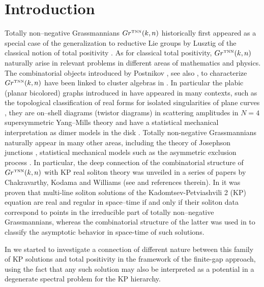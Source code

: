\documentclass[11pt]{amsart}
\theoremstyle{plain}
\numberwithin{equation}{section}
\def \GTNN {{Gr^{\mbox{\tiny TNN}} (k,n)}}
\begin{document}
\tableofcontents
\section{Introduction}

Totally non--negative Grassmannians $\GTNN$ historically first appeared as a special case of the generalization to reductive Lie groups by Lusztig  \cite{Lus1,Lus2} of the classical notion of total positivity \cite{GK,GK2,Sch,Kar}. As for  classical total positivity, $\GTNN$ naturally arise in relevant problems in different areas of mathematics and physics. The combinatorial objects introduced by Postnikov \cite{Pos}, see also \cite{Rie}, to characterize $\GTNN$ have been linked to cluster algebras in \cite{Sc,OPS}. In particular the plabic (planar bicolored) graphs introduced in \cite{Pos} have appeared in many contexts, such as the topological classification of real forms for isolated singularities of plane curves \cite{FPS}, they are on--shell diagrams (twistor diagrams) in scattering amplitudes in $N=4$ supersymmetric Yang--Mills theory \cite{AGP1,AGP2,ADM} and have a statistical mechanical interpretation as dimer models in the disk \cite{Lam1}. Totally non-negative Grassmannians naturally appear in many other areas, including the theory of Josephson junctions \cite{BG}, statistical mechanical models such as the asymmetric exclusion process \cite{CW}.  
In particular, the deep connection of the combinatorial structure of $\GTNN$ with KP real soliton theory was unveiled in a series of papers by Chakravarthy, Kodama and Williams (see \cite{CK,KW1,KW2} and references therein). In \cite{KW1}
it was proven that multi-line soliton solutions of the Kadomtsev-Petviashvili 2 (KP) equation are real and regular in space--time if and only if their soliton data correspond to points in the irreducible part of totally non--negative Grassmannians, whereas the combinatorial structure of the latter was used in \cite{CK,KW2} to classify the asymptotic behavior in space-time of such solutions.

In \cite{AG1,AG3} we started to investigate a connection of different nature between this family of KP solutions and total positivity in the framework of the finite-gap approach, using the fact that any such solution may also be interpreted as a potential in a degenerate spectral problem for the KP hierarchy.
\end{document}
